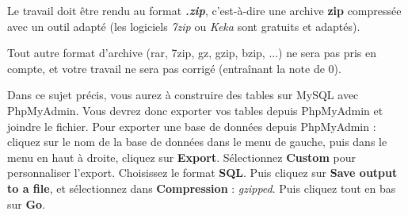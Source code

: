 


\noindent Le travail doit être rendu au format \textbf{\textit{.zip}}, c'est-à-dire une archive \textbf{zip} compressée avec un outil adapté (les logiciels \textit{7zip} ou \textit{Keka} sont gratuits et adaptés).

\noindent Tout autre format d'archive (rar, 7zip, gz, gzip, bzip, ...) ne sera pas pris en compte, et votre travail ne sera pas corrigé (entraînant la note de 0).

\vspace*{1cm}

\noindent Dans ce sujet précis, vous aurez à construire des tables sur MySQL avec PhpMyAdmin.
Vous devrez donc exporter vos tables depuis PhpMyAdmin et joindre le fichier.
Pour exporter une base de données depuis PhpMyAdmin : cliquez sur le nom de la base de données dans le menu de gauche, puis dans le menu en haut à droite, cliquez sur \textbf{Export}.
Sélectionnez \textbf{Custom} pour personnaliser l’export.
Choisissez le format \textbf{SQL}.
Puis cliquez sur \textbf{Save output to a file}, et sélectionnez dans \textbf{Compression} : \textit{gzipped}.
Puis cliquez tout en bas sur \textbf{Go}.
